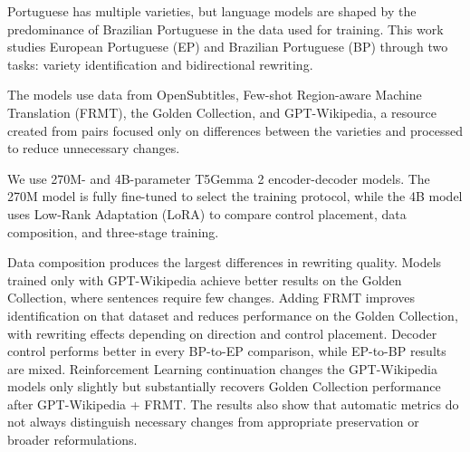 \acresetall
\noindent Portuguese has multiple varieties, but language models are shaped by the predominance of Brazilian Portuguese in the data used for training. This work studies European Portuguese (EP) and Brazilian Portuguese (BP) through two tasks: variety identification and bidirectional rewriting.

The models use data from OpenSubtitles, Few-shot Region-aware Machine Translation (FRMT), the Golden Collection, and GPT-Wikipedia, a resource created from pairs focused only on differences between the varieties and processed to reduce unnecessary changes.

We use 270M- and 4B-parameter T5Gemma 2 encoder-decoder models. The 270M model is fully fine-tuned to select the training protocol, while the 4B model uses Low-Rank Adaptation (LoRA) to compare control placement, data composition, and three-stage training.

Data composition produces the largest differences in rewriting quality. Models trained only with GPT-Wikipedia achieve better results on the Golden Collection, where sentences require few changes. Adding FRMT improves identification on that dataset and reduces performance on the Golden Collection, with rewriting effects depending on direction and control placement. Decoder control performs better in every BP-to-EP comparison, while EP-to-BP results are mixed. Reinforcement Learning continuation changes the GPT-Wikipedia models only slightly but substantially recovers Golden Collection performance after GPT-Wikipedia + FRMT. The results also show that automatic metrics do not always distinguish necessary changes from appropriate preservation or broader reformulations.
